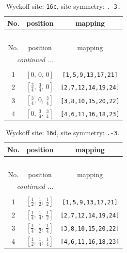 \documentclass[fleqn,8pt]{jsarticle}
\begin{document}
\renewcommand{\arraystretch}{1.2}
\begin{longtable}{ccc}
\caption{Wyckoff site: {\tt 16c}, site symmetry: {\tt .-3.}}
 \\
 \hline \hline
No. & position & mapping \\ \hline \endfirsthead

\multicolumn{2}{l}{\tablename\ \thetable{}} \\
 \hline \hline
No. & position & mapping \\ \hline \endhead

 \hline \hline
\multicolumn{2}{r}{\footnotesize\it continued ...} \\ \endfoot

 \hline \hline
\multicolumn{2}{r}{} \\ \endlastfoot

1 & $\left[ 0,\, 0,\, 0 \right]$ & {\tt [1,5,9,13,17,21]} \\ \hline
2 & $\left[ \frac{3}{4},\, \frac{3}{4},\, 0 \right]$ & {\tt [2,7,12,14,19,24]} \\ \hline
3 & $\left[ \frac{3}{4},\, 0,\, \frac{3}{4} \right]$ & {\tt [3,8,10,15,20,22]} \\ \hline
4 & $\left[ 0,\, \frac{3}{4},\, \frac{3}{4} \right]$ & {\tt [4,6,11,16,18,23]} \\
\end{longtable}
\renewcommand{\arraystretch}{1.2}
\begin{longtable}{ccc}
\caption{Wyckoff site: {\tt 16d}, site symmetry: {\tt .-3.}}
 \\
 \hline \hline
No. & position & mapping \\ \hline \endfirsthead

\multicolumn{2}{l}{\tablename\ \thetable{}} \\
 \hline \hline
No. & position & mapping \\ \hline \endhead

 \hline \hline
\multicolumn{2}{r}{\footnotesize\it continued ...} \\ \endfoot

 \hline \hline
\multicolumn{2}{r}{} \\ \endlastfoot

1 & $\left[ \frac{1}{2},\, \frac{1}{2},\, \frac{1}{2} \right]$ & {\tt [1,5,9,13,17,21]} \\ \hline
2 & $\left[ \frac{1}{4},\, \frac{1}{4},\, \frac{1}{2} \right]$ & {\tt [2,7,12,14,19,24]} \\ \hline
3 & $\left[ \frac{1}{4},\, \frac{1}{2},\, \frac{1}{4} \right]$ & {\tt [3,8,10,15,20,22]} \\ \hline
4 & $\left[ \frac{1}{2},\, \frac{1}{4},\, \frac{1}{4} \right]$ & {\tt [4,6,11,16,18,23]} \\
\end{longtable}
\end{document}
